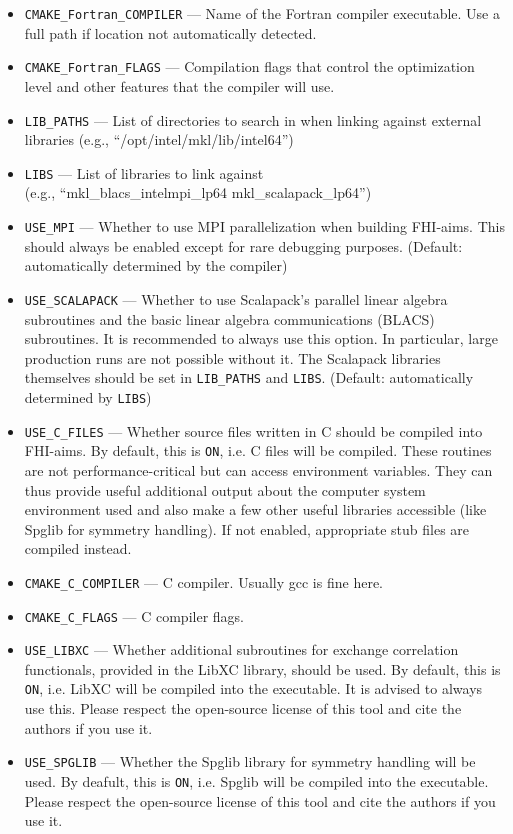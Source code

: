 \begin{itemize}
\item \texttt{CMAKE\_Fortran\_COMPILER} --- Name of the Fortran compiler executable. Use a full path if location not automatically detected.
\item \texttt{CMAKE\_Fortran\_FLAGS} ---  Compilation flags that control the optimization level and other features that the compiler will use. \item \texttt{LIB\_PATHS} --- List of directories to search in when linking against external libraries (e.g., ``/opt/intel/mkl/lib/intel64'')
\item \texttt{LIBS} --- List of libraries to link against \\
  (e.g., ``mkl\_blacs\_intelmpi\_lp64 mkl\_scalapack\_lp64'')
\item \texttt{USE\_MPI} ---  Whether to use MPI parallelization when building FHI-aims. This should always be enabled except for rare debugging purposes. (Default: automatically determined by the compiler)
\item \texttt{USE\_SCALAPACK} --- Whether to use Scalapack's parallel linear algebra subroutines and the basic linear algebra communications (BLACS) subroutines. It is recommended to always use this option. In particular, large production runs are not possible without it. The Scalapack libraries themselves should be set in \texttt{LIB\_PATHS} and \texttt{LIBS}. (Default: automatically determined by \texttt{LIBS})
\item \texttt{USE\_C\_FILES} ---  Whether source files written in C should be compiled into FHI-aims.  By default, this is \texttt{ON}, i.e. C files will be compiled.  These routines are not performance-critical but can access environment variables. They can thus provide useful additional output about the computer system environment used and also make a few other useful libraries accessible (like Spglib for symmetry handling). If not enabled, appropriate stub files are compiled instead.
\item \texttt{CMAKE\_C\_COMPILER} --- C compiler. Usually gcc is fine here.
\item \texttt{CMAKE\_C\_FLAGS} --- C compiler flags.
\item \texttt{USE\_LIBXC} --- Whether additional subroutines for exchange correlation functionals, provided in the LibXC library, should be used. By default, this is \texttt{ON}, i.e. LibXC will be compiled into the executable.  It is advised to always use this. Please respect the open-source license of this tool and cite the authors if you use it.
\item \texttt{USE\_SPGLIB} ---  Whether the Spglib library for symmetry handling will be used.  By deafult, this is \texttt{ON}, i.e. Spglib will be compiled into the executable.  Please respect the open-source license of this tool and cite the authors if you use it.
\end{itemize}


